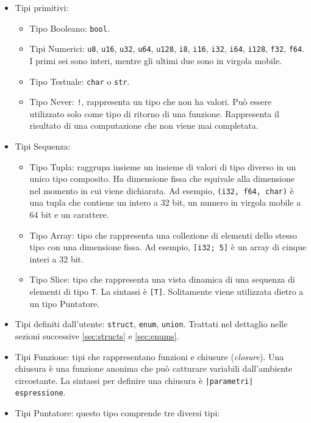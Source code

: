 \begin{itemize}
    \item Tipi primitivi:
        \begin{itemize}
            \item Tipo Booleano: \texttt{bool}.
            \item Tipi Numerici: \texttt{u8}, \texttt{u16}, \texttt{u32}, \texttt{u64}, \texttt{u128}, \texttt{i8}, \texttt{i16}, \texttt{i32}, \texttt{i64}, \texttt{i128}, \texttt{f32}, \texttt{f64}. I primi sei sono interi, mentre gli ultimi due sono in virgola mobile.
            \item Tipo Testuale: \texttt{char} o \texttt{str}. 
            \item Tipo Never: \texttt{!}, rappresenta un tipo che non ha valori. Può essere utilizzato solo come tipo di ritorno di una funzione. Rappresenta il risultato di una computazione che non viene mai completata. 
        \end{itemize} 
    \item Tipi Sequenza: 
        \begin{itemize}
            \item Tipo Tupla: raggrupa insieme un insieme di valori di tipo diverso in un unico tipo composito. Ha dimensione fissa che equivale alla dimensione nel momento in cui viene dichiarata. Ad esempio, \texttt{(i32, f64, char)} è una tupla che contiene un intero a 32 bit, un numero in virgola mobile a 64 bit e un carattere.
            \item Tipo Array: tipo che rappresenta una collezione di elementi dello stesso tipo con una dimensione fissa. Ad esempio, \texttt{[i32; 5]} è un array di cinque interi a 32 bit.
            \item Tipo Slice: tipo che rappresenta una vista dinamica di una sequenza di elementi di tipo \texttt{T}. La sintassi è \texttt{[T]}. Solitamente viene utilizzata dietro a un tipo Puntatore.
        \end{itemize}
        \item Tipi definiti dall'utente: \texttt{struct}, \texttt{enum}, \texttt{union}. Trattati nel dettaglio nelle sezioni successive \ref{sec:structs} e \ref{sec:enums}.
        \item Tipi Funzione: tipi che rappresentano funzioni e chiusure (\textit{closure}). Una chiusura è una funzione anonima che può catturare variabili dall'ambiente circostante. La sintassi per definire una chiusura è \texttt{|parametri| espressione}.
        \item Tipi Puntatore: questo tipo comprende tre diversi tipi:

\end{itemize}
